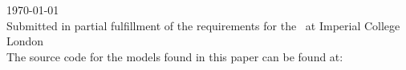 \begin{titlepage}
\begin{minipage}{0.45\textwidth}
\begin{center}
\begin{flushleft}
    \end{flushleft}
\end{center}
\end{minipage}
\makeatother

\vspace{11pt}
\makeatletter
{\large \today}\\[2cm] %
\makeatother
\vfill %
Submitted in partial fulfillment of the requirements for the \degreetype~at Imperial College London\\[0.5cm]
The source code for the models found in this paper can be found at: \sourcecode


\end{titlepage}
